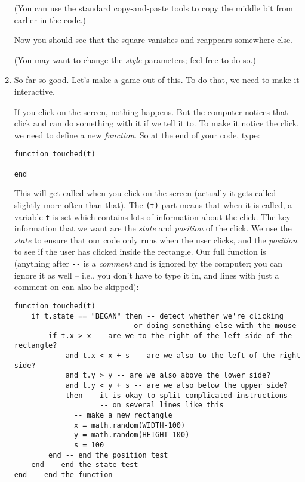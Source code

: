 \documentclass[
  xhtml,%
  text
]{internet}
\begin{document}
\begin{enumerate}
(You can use the standard copy-and-paste tools to copy the middle bit from earlier in the code.)

Now you should see that the square vanishes and reappears somewhere else.

(You may want to change the \emph{style} parameters; feel free to do so.)

\item So far so good.
Let's make a game out of this.
To do that, we need to make it interactive.

If you click on the screen, nothing happens.
But the computer notices that click and can do something with it if we tell it to.
To make it notice the click, we need to define a new \emph{function}.
So at the end of your code, type:

\begin{verbatim}
function touched(t)

end
\end{verbatim}

This will get called when you click on the screen (actually it gets called slightly more often than that).
The \verb+(t)+ part means that when it is called, a variable \verb+t+ is set which contains lots of information about the click.
The key information that we want are the \emph{state} and \emph{position} of the click.
We use the \emph{state} to ensure that our code only runs when the user clicks, and the \emph{position} to see if the user has clicked inside the rectangle.
Our full function is (anything after \verb+--+ is a \emph{comment} and is ignored by the computer; you can ignore it as well -- i.e., you don't have to type it in, and lines with just a comment on can also be skipped):

\begin{verbatim}
function touched(t)
    if t.state == "BEGAN" then -- detect whether we're clicking
                         -- or doing something else with the mouse
        if t.x > x -- are we to the right of the left side of the rectangle?
            and t.x < x + s -- are we also to the left of the right side?
            and t.y > y -- are we also above the lower side?
            and t.y < y + s -- are we also below the upper side?
            then -- it is okay to split complicated instructions
                    -- on several lines like this
              -- make a new rectangle
              x = math.random(WIDTH-100)
              y = math.random(HEIGHT-100)
              s = 100
        end -- end the position test
    end -- end the state test
end -- end the function
\end{verbatim}


\end{enumerate}
\end{document}
